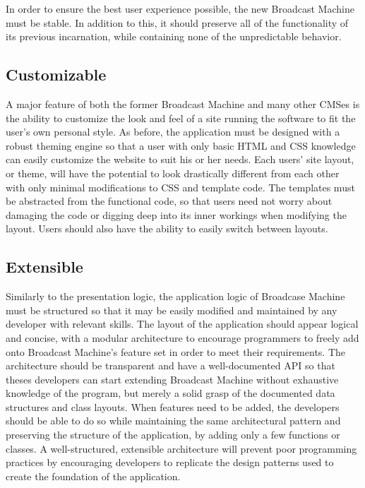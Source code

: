 \documentclass[a4paper,12pt]{report}
\begin{document}
In order to ensure the best user experience possible, the new Broadcast Machine must be stable. In addition to this, it should preserve all of the functionality of its previous incarnation, while containing none of the unpredictable behavior.

\subsection{Customizable} 
A major feature of both the former Broadcast Machine and many other CMSes is the ability to customize the look and feel of a site running the software to fit the user's own personal style. 
As before, the application must be designed with a robust theming engine so that a user with only basic HTML and CSS knowledge can easily customize the website to suit his or her needs. 
Each users' site layout, or theme, will have the potential to look drastically different from each other with only minimal modifications to CSS and template code. 
The templates must be abstracted from the functional code, so that users need not worry about damaging the code or digging deep into its inner workings when modifying the layout. 
Users should also have the ability to easily switch between layouts. 


\subsection{Extensible} 
Similarly to the presentation logic, the application logic of Broadcase Machine must be structured so that it may be easily modified and maintained by any developer with relevant skills. 
The layout of the application should appear logical and concise, with a modular architecture to encourage programmers to freely add onto Broadcast Machine's feature set in order to meet their requirements.
The architecture should be transparent and have a well-documented API so that theses developers can start extending Broadcast Machine without exhaustive knowledge of the program, but merely a solid grasp of the documented data structures and class layouts. 
When features need to be added, the developers should be able to do so while maintaining the same architectural pattern and preserving the structure of the application, by adding only a few functions or classes. 
A well-structured, extensible architecture will prevent poor programming practices by encouraging developers to replicate the design patterns used to create the foundation of the application.
\end{document}
